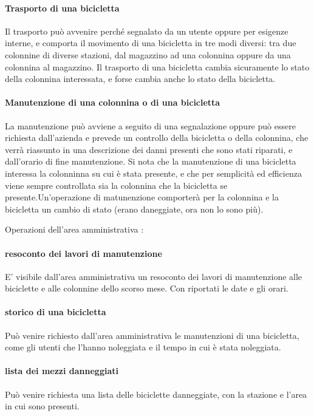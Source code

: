 \documentclass[a4paper,twoside]{article}
\begin{document}
\paragraph{Trasporto di una bicicletta} Il trasporto può avvenire perché segnalato da un utente oppure per esigenze interne, e comporta il movimento di una bicicletta in tre modi diversi: tra due colonnine di diverse stazioni, dal magazzino ad una colonnina oppure da una colonnina al magazzino. Il trasporto di una bicicletta cambia sicuramente lo stato della colonnina interessata, e forse cambia anche lo stato della bicicletta.
\paragraph{Manutenzione di una colonnina o di una bicicletta} La manutenzione può avviene a seguito di una segnalazione oppure può essere richiesta dall'azienda e prevede un controllo della bicicletta o della colonnina, che verrà riassunto in una descrizione dei danni presenti che sono stati riparati, e dall'orario di fine manutenzione. Si nota che la manutenzione di una bicicletta interessa la colonninna su cui è stata presente, e che per semplicità ed efficienza viene sempre controllata sia la colonnina che la bicicletta se presente.Un'operazione di matunenzione comporterà per la colonnina e la bicicletta un cambio di stato (erano daneggiate, ora non lo sono più).\newline
\par Operazioni dell'area amministrativa :
\paragraph{resoconto dei lavori di manutenzione} E' visibile dall'area amministrativa un resoconto dei lavori di manutenzione alle biciclette e alle colonnine dello scorso mese. Con riportati le date e gli orari.
\paragraph{storico di una bicicletta} Può venire richiesto dall'area amministrativa le manutenzioni di una bicicletta, come gli utenti che l'hanno noleggiata e il tempo in cui è stata noleggiata.
\paragraph{lista dei mezzi danneggiati} Può venire richiesta una lista delle biciclette danneggiate, con la stazione e l'area in cui sono presenti.
\end{document}
